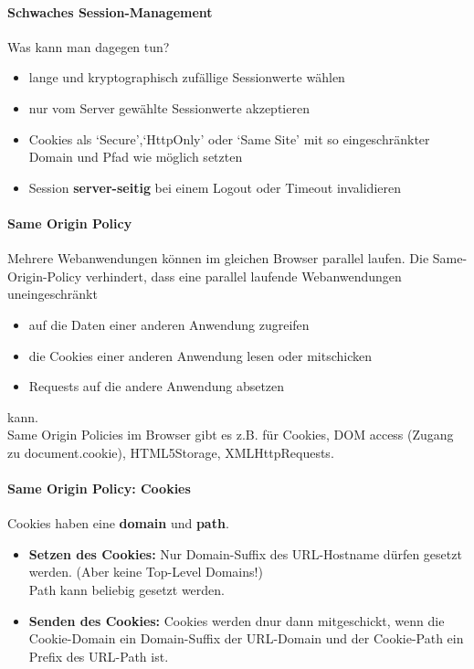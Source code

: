 \documentclass[10pt,a4paper]{article}
\begin{document}
\paragraph*{Schwaches Session-Management}Was kann man dagegen tun?
\begin{itemize}[noitemsep,topsep=0pt,leftmargin=*]
    \item lange und kryptographisch zufällige Sessionwerte wählen
    \item nur vom Server gewählte Sessionwerte akzeptieren
    \item Cookies als `Secure',`HttpOnly' oder `Same Site' mit so eingeschränkter Domain und Pfad wie möglich setzten
    \item Session \textbf{server-seitig} bei einem Logout oder Timeout invalidieren
\end{itemize}
\paragraph*{Same Origin Policy}Mehrere Webanwendungen können im gleichen Browser parallel laufen. Die Same-Origin-Policy verhindert, dass eine parallel laufende Webanwendungen uneingeschränkt
\begin{itemize}[noitemsep,topsep=0pt,leftmargin=*]
    \item auf die Daten einer anderen Anwendung zugreifen
    \item die Cookies einer anderen Anwendung lesen oder mitschicken
    \item Requests auf die andere Anwendung absetzen
\end{itemize} kann.\\
Same Origin Policies im Browser gibt es z.B. für Cookies, DOM access (Zugang zu document.cookie), HTML5Storage, XMLHttpRequests.
\paragraph*{Same Origin Policy: Cookies} Cookies haben eine \textbf{domain} und \textbf{path}.
\begin{itemize}[noitemsep,topsep=0pt,leftmargin=*]
    \item \textbf{Setzen des Cookies:} Nur Domain-Suffix des URL-Hostname dürfen gesetzt werden. (Aber keine Top-Level Domains!)\\
    Path kann beliebig gesetzt werden.
    \item \textbf{Senden des Cookies:} Cookies werden dnur dann mitgeschickt, wenn die Cookie-Domain ein Domain-Suffix der URL-Domain und der Cookie-Path ein Prefix des URL-Path ist.
\end{itemize}
\end{document}

